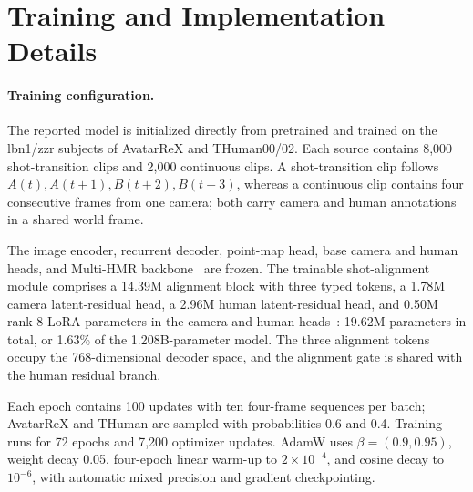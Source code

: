 \section{Training and Implementation Details}
\label{app:implementation}

\paragraph{Training configuration.}
The reported \method{} model is initialized directly from pretrained
\humanthree{} and trained on the lbn1/zzr subjects of AvatarReX and
THuman00/02. Each source contains 8,000 shot-transition clips and 2,000
continuous clips. A shot-transition clip follows
$A(t),A(t+1),B(t+2),B(t+3)$, whereas a continuous clip contains four consecutive frames
from one camera; both carry camera and human annotations in a shared world
frame.

The image encoder, recurrent decoder, point-map head, base camera and human heads,
and Multi-HMR backbone~\citep{baradel2024multihmr} are frozen. The trainable
shot-alignment module comprises a 14.39M alignment block with three typed
tokens, a 1.78M camera latent-residual head, a 2.96M human latent-residual head, and 0.50M
rank-8 LoRA parameters in the camera and human heads~\citep{hu2022lora}: 19.62M parameters
in total, or 1.63\% of the 1.208B-parameter model. The three alignment tokens
occupy the 768-dimensional decoder space, and the alignment gate is shared
with the human residual branch.

Each epoch contains 100 updates with ten four-frame sequences per batch;
AvatarReX and THuman are sampled with probabilities 0.6 and 0.4. Training runs
for 72 epochs and 7,200 optimizer updates. AdamW uses
$\beta=(0.9,0.95)$, weight decay 0.05, four-epoch linear warm-up to
$2\!\times\!10^{-4}$, and cosine decay to $10^{-6}$, with automatic mixed
precision and gradient checkpointing.

